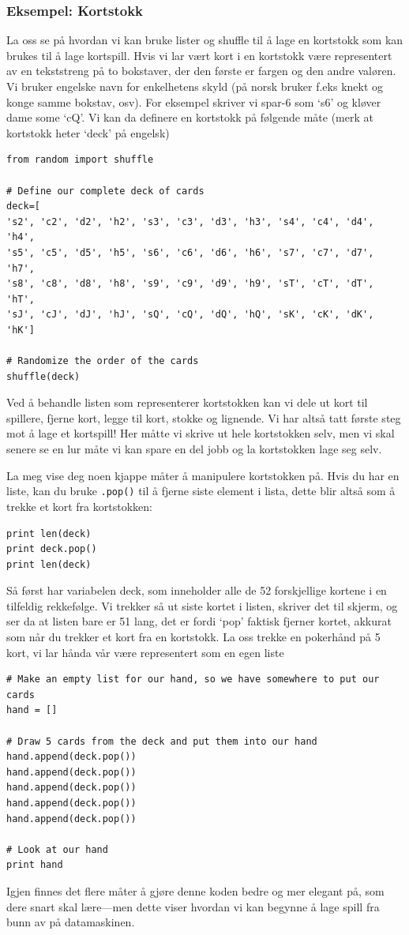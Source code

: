 \documentclass[a4paper, 11pt, notitlepage]{article}
\begin{document}
\subsubsection*{Eksempel: Kortstokk}

La oss se på hvordan vi kan bruke lister og shuffle til å lage en kortstokk som kan brukes til å lage kortspill. Hvis vi lar vært kort i en kortstokk være representert av en tekststreng på to bokstaver, der den første er fargen og den andre valøren. Vi bruker engelske navn for enkelhetens skyld (på norsk bruker f.eks knekt og konge samme bokstav, osv). For eksempel skriver vi spar-6 som `s6' og kløver dame some `cQ'. Vi kan da definere en kortstokk på følgende måte (merk at kortstokk heter `deck' på engelsk)
\begin{lstlisting}
from random import shuffle

# Define our complete deck of cards
deck=[
's2', 'c2', 'd2', 'h2', 's3', 'c3', 'd3', 'h3', 's4', 'c4', 'd4', 'h4',
's5', 'c5', 'd5', 'h5', 's6', 'c6', 'd6', 'h6', 's7', 'c7', 'd7', 'h7',
's8', 'c8', 'd8', 'h8', 's9', 'c9', 'd9', 'h9', 'sT', 'cT', 'dT', 'hT',
'sJ', 'cJ', 'dJ', 'hJ', 'sQ', 'cQ', 'dQ', 'hQ', 'sK', 'cK', 'dK', 'hK']

# Randomize the order of the cards
shuffle(deck)
\end{lstlisting}
Ved å behandle listen som representerer kortstokken kan vi dele ut kort til spillere, fjerne kort, legge til kort, stokke og lignende. Vi har altså tatt første steg mot å lage et kortspill! Her måtte vi skrive ut hele kortstokken selv, men vi skal senere se en lur måte vi kan spare en del jobb og la kortstokken lage seg selv.

La meg vise deg noen kjappe måter å manipulere kortstokken på. Hvis du har en liste, kan du bruke \verb+.pop()+ til å fjerne siste element i lista, dette blir altså som å trekke et kort fra kortstokken:
\begin{lstlisting}
print len(deck)
print deck.pop()
print len(deck)
\end{lstlisting}
Så først har variabelen deck, som inneholder alle de 52 forskjellige kortene i en tilfeldig rekkefølge. Vi trekker så ut siste kortet i listen, skriver det til skjerm, og ser da at listen bare er 51 lang, det er fordi `pop' faktisk fjerner kortet, akkurat som når du trekker et kort fra en kortstokk. La oss trekke en pokerhånd på 5 kort, vi lar hånda vår være representert som en egen liste
\begin{lstlisting}
# Make an empty list for our hand, so we have somewhere to put our cards
hand = []

# Draw 5 cards from the deck and put them into our hand
hand.append(deck.pop())
hand.append(deck.pop())
hand.append(deck.pop())
hand.append(deck.pop())
hand.append(deck.pop())

# Look at our hand
print hand
\end{lstlisting}
Igjen finnes det flere måter å gjøre denne koden bedre og mer elegant på, som dere snart skal lære---men dette viser hvordan vi kan begynne å lage spill fra bunn av på datamaskinen.
\end{document}

